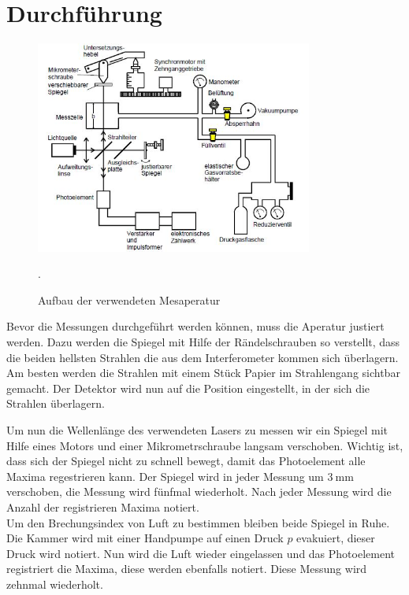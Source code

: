 
\section{Durchführung}
\begin{figure}[H]
  \centering
  \includegraphics[height=7cm]{aufbau.JPG}
  \caption{Aufbau der verwendeten Mesaperatur}
  \label{fig:aufbau}
  \cite{skript}.
\end{figure}
Bevor die Messungen durchgeführt werden können, muss die Aperatur justiert werden.
Dazu werden die Spiegel mit Hilfe der Rändelschrauben so verstellt, dass die beiden hellsten
Strahlen die aus dem Interferometer kommen sich überlagern. Am besten werden die Strahlen mit
einem Stück Papier im Strahlengang sichtbar gemacht. Der Detektor wird nun auf die
Position eingestellt, in der sich die Strahlen überlagern.

Um nun die Wellenlänge des verwendeten Lasers zu messen wir ein Spiegel mit Hilfe eines Motors
und einer Mikrometrschraube langsam verschoben. Wichtig ist, dass sich der Spiegel nicht zu schnell
bewegt, damit das Photoelement alle Maxima regestrieren kann. Der Spiegel wird in jeder
Messung um $\SI{3}{\mm}$ verschoben, die Messung wird fünfmal wiederholt. Nach jeder Messung
wird die Anzahl der registrieren Maxima notiert.\\
Um den Brechungsindex von Luft zu bestimmen bleiben beide Spiegel in Ruhe.
Die Kammer wird mit einer Handpumpe auf einen Druck $p$ evakuiert, dieser Druck wird notiert.
Nun wird die Luft wieder eingelassen und das Photoelement registriert die Maxima, diese werden
ebenfalls notiert. Diese Messung wird zehnmal wiederholt.
